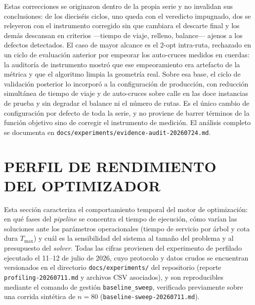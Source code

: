 Estas correcciones se originaron dentro de la propia serie y no invalidan sus conclusiones:
de los dieciséis ciclos, uno queda con el veredicto impugnado, dos se releyeron con el
instrumento corregido sin que cambiara el descarte final y los demás descansan en criterios
—tiempo de viaje, relleno, balance— ajenos a los defectos detectados. El caso de mayor
alcance es el 2-opt intra-ruta, rechazado en un ciclo de evaluación anterior por empeorar
los auto-cruces medidos en cuerdas: la auditoría de instrumento mostró que ese
empeoramiento era artefacto de la métrica y que el algoritmo limpia la geometría real.
Sobre esa base, el ciclo de validación posterior lo incorporó a la configuración de
producción, con reducción simultánea de tiempo de viaje y
de auto-cruces sobre calle en las doce instancias de prueba y sin degradar el balance ni el
número de rutas. Es el único cambio de configuración por defecto de toda la serie, y no
proviene de barrer términos de la función objetivo sino de corregir el instrumento de
medición. El análisis completo se documenta en
\texttt{docs/experiments/evidence-audit-20260724.md}.

\section{PERFIL DE RENDIMIENTO DEL OPTIMIZADOR}
\label{sec:perfil-rendimiento}

Esta sección caracteriza el comportamiento temporal del motor de optimización:
en qué fases del \textit{pipeline} se concentra el tiempo de ejecución, cómo
varían las soluciones ante los parámetros operacionales (tiempo de servicio por
árbol y cota dura $T_{\max}$) y cuál es la sensibilidad del sistema al tamaño
del problema y al presupuesto del \textit{solver}. Todas las cifras provienen del
experimento de perfilado ejecutado el 11--12 de julio de 2026, cuyo protocolo y
datos crudos se encuentran versionados en el directorio
\texttt{docs/experiments/} del repositorio (reporte
\texttt{profiling-20260711.md} y archivos CSV asociados), y son reproducibles
mediante el comando de gestión \texttt{baseline\_sweep}, verificado
previamente sobre una corrida sintética de $n=80$
(\texttt{baseline-sweep-20260711.md}).

